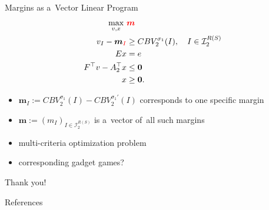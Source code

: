 \documentclass{beamer}
\newcommand{\vect}[1]{\boldsymbol{#1}}
\newcommand{\I}{\mathcal{I}}
\begin{document}
  \begin{frame}{Margins as a~Vector Linear Program}
    \begin{equation}
      \label{vlp:max-margins}
      \begin{split}
        \max_{v, x}\ &\textcolor{red}{\vect{m}} \\
        v_I - \vect{m}_{\textcolor{red}{I}} &\ge CBV_2^{\sigma_1}(I), \quad I \in \I_2^{R(S)}\\ 
        Ex &= e \\
        F^\top v - A_2^\top x &\le \vect{0} \\
        x &\ge \vect{0}.
      \end{split}
    \end{equation}

    \pause
    \begin{itemize}[<+- | alert@+>]
      \item $\vect{m}_I := CBV_2^{\sigma_1} (I) - CBV_2^{\sigma_1'} (I)$ corresponds to one specific margin
      \item $\vect{m} := (m_I) _{I\in\I_2^{R(S)}}$ is a~vector of~all such margins
      \item multi-criteria optimization problem
      \item corresponding gadget games?
    \end{itemize}
  \end{frame}

  \begin{frame}[standout]
    \begin{center}
      Thank you!
    \end{center}
  \end{frame}


  \begin{frame}[allowframebreaks]{References}
    \tiny
    \printbibliography[heading=none]
  \end{frame}
\end{document}
